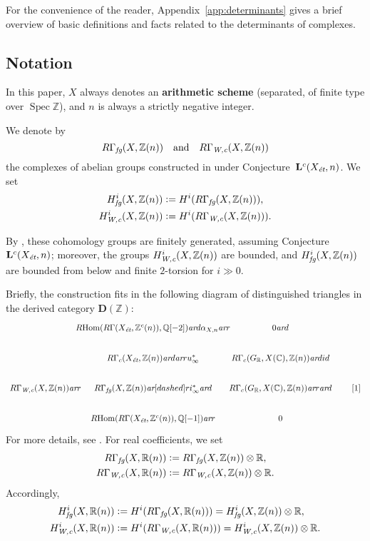 \documentclass[10pt,a4paper,oneside]{article}
\DeclareMathOperator{\Hom}{Hom}
\DeclareMathOperator{\Spec}{Spec}
\newcommand{\CC}{\mathbb{C}}
\newcommand{\QQ}{\mathbb{Q}}
\newcommand{\RR}{\mathbb{R}}
\newcommand{\ZZ}{\mathbb{Z}}
\newcommand{\ar}{\text{\it ar}}
\newcommand{\et}{\text{\it \'{e}t}}
\newcommand{\fg}{\text{\it fg}}
\newcommand{\Wc}{\text{\it W,c}}
\newcommand{\dfn}{\mathrel{\mathop:}=}
\newcommand{\RHom}{R\!\Hom}
\theoremstyle{myplain}
\theoremstyle{mydefinition}
\numberwithin{equation}{section}
\begin{document}
For the convenience of the reader, Appendix~\ref{app:determinants} gives a brief
overview of basic definitions and facts related to the determinants of
complexes.

\subsection*{Notation}

In this paper, $X$ always denotes an \textbf{arithmetic scheme} (separated, of
finite type over $\Spec \ZZ$), and $n$ is always a strictly negative integer.

We denote by
\[
  R\Gamma_\fg (X, \ZZ (n))
  \quad\text{and}\quad
  R\Gamma_\Wc (X, \ZZ (n))
\]
the complexes of abelian groups constructed in \cite{Beshenov-Weil-etale-1}
under Conjecture~$\mathbf{L}^c (X_\et,n)$. We set
\begin{align*}
  H^i_\fg (X, \ZZ (n)) & \dfn H^i (R\Gamma_\fg (X, \ZZ (n))), \\
  H^i_\Wc (X, \ZZ (n)) & \dfn H^i (R\Gamma_\Wc (X, \ZZ (n))).
\end{align*}

By \cite[Proposition 5.5 and 7.12]{Beshenov-Weil-etale-1}, these
cohomology groups are finitely generated, assuming
Conjecture~$\mathbf{L}^c (X_\et,n)$; moreover, the groups $H^i_\Wc (X, \ZZ(n))$
are bounded, and $H^i_\fg (X, \ZZ (n))$ are bounded from below and finite
$2$-torsion for $i \gg 0$.

Briefly, the construction fits in the following diagram of distinguished
triangles in the derived category $\mathbf{D} (\ZZ)$:
\[ \begin{tikzcd}[column sep=1.5em]
    &[-3em] \RHom (R\Gamma (X_\et, \ZZ^c (n)), \QQ [-2]) \ar{d}{\alpha_{X,n}} \ar{r} &[-2.5em] 0 \ar{d} \\
    & R\Gamma_c (X_\et, \ZZ(n)) \ar{d}\ar{r}{u_\infty^*} & R\Gamma_c (G_\RR, X (\CC), \ZZ(n))\ar{d}{id} \\
    R\Gamma_\Wc (X, \ZZ (n)) \ar{r} & R\Gamma_\fg (X, \ZZ(n)) \ar[dashed]{r}{i_\infty^*}\ar{d} & R\Gamma_c (G_\RR, X (\CC), \ZZ(n)) \ar{r} \ar{d} & {[1]} \\
    & \RHom (R\Gamma (X_\et, \ZZ^c (n)), \QQ [-1]) \ar{r} & 0
\end{tikzcd} \]
For more details, see \cite{Beshenov-Weil-etale-1}.
For real coefficients, we set
\begin{align*}
  R\Gamma_\fg (X, \RR (n)) & \dfn R\Gamma_\fg (X, \ZZ (n)) \otimes \RR, \\
  R\Gamma_\Wc (X, \RR (n)) & \dfn R\Gamma_\Wc (X, \ZZ (n)) \otimes \RR.
\end{align*}
Accordingly,
\begin{align*}
  H^i_\fg (X, \RR (n)) & \dfn H^i (R\Gamma_\fg (X, \RR (n))) = H^i_\fg (X, \ZZ (n)) \otimes \RR, \\
  H^i_\Wc (X, \RR (n)) & \dfn H^i (R\Gamma_\Wc (X, \RR (n))) = H^i_\Wc (X, \ZZ (n)) \otimes \RR.
\end{align*}
\end{document}
